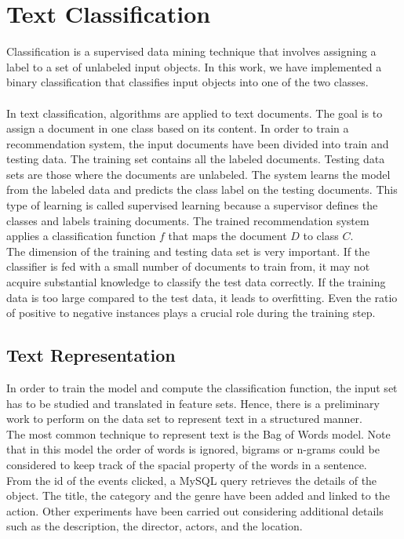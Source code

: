 \section*{Text Classification}
\label{sec: textClass}

Classification is a supervised data mining technique that involves assigning a label to a set of unlabeled input objects. In this work, we have implemented a binary classification that classifies input objects into one of the two classes.\\
\\
In text classification, algorithms are applied to text documents. The goal is to assign a document in one class based on its content. In order to train a recommendation system, the input documents have been divided into train and testing data. The training set contains all the labeled documents. Testing data sets are those where the documents are unlabeled. The system learns the model from the labeled data and predicts the class label on the testing documents. This type of learning is called supervised learning because a supervisor defines  the  classes  and  labels  training  documents. 
The trained recommendation system applies a classification function $f$ that maps the document $D$ to class $C$.\\
The dimension of the training and testing data set is very important. If the classifier is fed with a small number of documents to train from, it may not acquire substantial knowledge to classify the test data correctly. If the training data is too large compared to the test data, it leads to overfitting.  Even the ratio of positive to negative instances plays a crucial role during the training step.

\subsection*{Text Representation}

In order to train the model and compute the classification function, the input set has to be studied and translated in feature sets. Hence, there is a preliminary work to perform on the data set to represent text in a structured manner.\\
The most common technique to represent text is the Bag of Words model. Note that in this model the order of words is ignored, bigrams or n-grams could be considered to keep track of the spacial property of the words in a sentence.\\
From the id of the events clicked, a MySQL query retrieves the details of the object. The title, the category and the genre have been added and linked to the action. Other experiments have been carried out considering additional details such as the description, the director, actors, and the location. 

